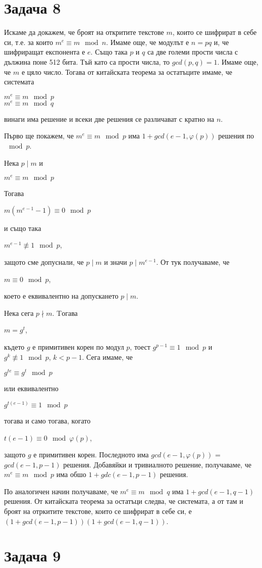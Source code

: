 \documentclass{article}
\begin{document}
\section*{Задача 8}

\justify
Искаме да докажем, че броят на откритите текстове $m$, които се шифрират в себе си, т.е. за които $m^e \equiv m \mod n$. Имаме още, че модулът е $n = pq$ и, че шифриращат експонента е $e$. Също така $p$ и $q$ са две големи прости числа с дължина поне 512 бита. Тъй като са прости числа, то $gcd(p,q) = 1$. Имаме още, че $m$ е цяло число. Тогава от китайската теорема за остатъците имаме, че системата 

\begin{center}
    $m^e \equiv m \mod p$ \\
    $m^e \equiv m \mod q$
\end{center}

\justify
винаги има решение и всеки две решения се различават с кратно на $n$.


\justify
Първо ще покажем, че $m^e \equiv m \mod p$ има $1 + gcd(e-1,\varphi(p))$ решения по $\mod p$.

\justify
Нека $p \mid m$ и
\begin{center}
    $m^e \equiv m \mod p$
\end{center}
\justify
Тогава 
\begin{center}
    $m(m^{e-1}-1) \equiv 0 \mod p$
\end{center} 
\justify
и също така 
\begin{center}
    $m^{e-1} \not\equiv 1 \mod p$,
\end{center}
\justify
защото сме допуснали, че $p \mid m$ и значи $p \mid m^{e-1}$. От тук получаваме, че 
\begin{center}
    $m \equiv 0 \mod p$,
\end{center}
\justify
което е еквивалентно на допускането $p \mid m$.

\justify
Нека сега $p \nmid m$. Tогава 
\begin{center}
    $m = g^t$,
\end{center}
\justify
където $g$ е примитивен корен по модул $p$, тоест $g^{p-1} \equiv 1 \mod p$ и $g^k \not\equiv 1 \mod p$, $k < p-1$. Сега имаме, че 
\begin{center}
    $g^{te} \equiv g^t \mod p$
\end{center}
\justify
или еквивалентно
\begin{center}
    $g^{t(e-1)} \equiv 1 \mod p$
\end{center}
\justify
тогава и само тогава, когато 
\begin{center}
    $t(e-1) \equiv 0 \mod \varphi(p)$,
\end{center}
\justify
защото $g$ е примитивен корен. Последното има $gcd(e-1,\varphi(p))$ = $gcd(e-1,p-1)$ решения. Добавяйки и тривиалното решение, получаваме, че $m^e \equiv m \mod p$ има обшо $1 + gdc(e-1,p-1)$ решения.

\justify
По аналогичен начин получаваме, че $m^e \equiv m \mod q$ има $1 + gcd(e-1,q-1)$ решения. От китайската теорема за остатъци следва, че системата, а от там и броят на отркитите текстове, които се шифрират в себе си, е $(1 + gcd(e-1,p-1))(1 + gcd(e-1,q-1))$.

\section*{Задача 9}
\end{document}
